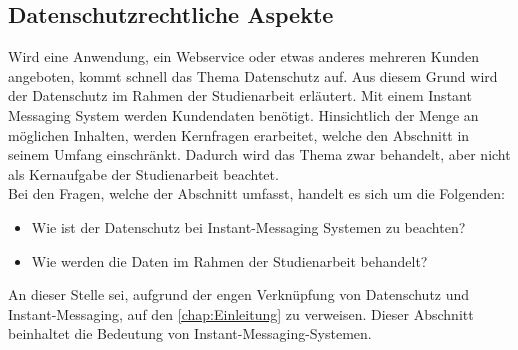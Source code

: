 \documentclass[a4paper,titlepage,halfparskip,12pt]{scrreprt}
\begin{document}
\begin{onehalfspacing}
\pagebreak

\chapter{Datenschutzrechtliche Aspekte}
\label{chap:Datenschutz}
Wird eine Anwendung, ein Webservice oder etwas anderes mehreren Kunden angeboten, kommt schnell das Thema Datenschutz auf. Aus diesem Grund wird der Datenschutz im Rahmen der Studienarbeit erläutert. Mit einem Instant Messaging System werden Kundendaten benötigt. Hinsichtlich der Menge an möglichen Inhalten, werden Kernfragen erarbeitet, welche den Abschnitt in seinem Umfang einschränkt. Dadurch wird das Thema zwar behandelt, aber nicht als Kernaufgabe der Studienarbeit beachtet.\\
Bei den Fragen, welche der Abschnitt umfasst, handelt es sich um die Folgenden:
\begin{itemize}
	\item Wie ist der Datenschutz bei Instant-Messaging Systemen zu beachten?
	\item Wie werden die Daten im Rahmen der Studienarbeit behandelt?
\end{itemize}
An dieser Stelle sei, aufgrund der engen Verknüpfung von Datenschutz und Instant-Messaging, auf den \autoref{chap:Einleitung} zu verweisen. Dieser Abschnitt beinhaltet die Bedeutung von Instant-Messaging-Systemen.


\end{onehalfspacing}
\end{document}
